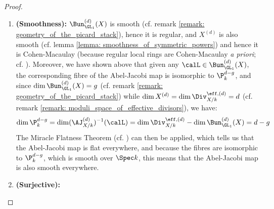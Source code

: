 \begin{proof}
\begin{enumerate}
                        \item \textbf{(Smoothness):} $\Bun_{\GL_1}^{(d)}(X)$ is smooth (cf. remark \ref{remark: geometry_of_the_picard_stack}), hence it is regular, and $X^{(d)}$ is also smooth (cf. lemma \ref{lemma: smoothness_of_symmetric_powers}) and hence it is Cohen-Macaulay (because regular local rings are Cohen-Macaulay \textit{a priori}; cf. \cite[\href{https://stacks.math.columbia.edu/tag/00NQ}{Tag 00NQ}]{stacks}). Moreover, we have shown above that given any $\calL \in \Bun_{\GL_1}^{(d)}(X)$, the corresponding fibre of the Abel-Jacobi map is isomorphic to $\P^{d - g}_k$, and since $\dim \Bun_{\GL_1}^{(d)}(X) = g$ (cf. remark \ref{remark: geometry_of_the_picard_stack}) while $\dim X^{(d)} = \dim \Div_{X/k}^{\eff, (d)} = d$ (cf. remark \ref{remark: moduli_space_of_effective_divisors}), we have:
                            $$\dim \P^{d - g}_k = \dim (\AJ_{X/k}^{(d)})^{-1}(\calL) = \dim \Div_{X/k}^{\eff, (d)} - \dim \Bun_{\GL_1}^{(d)}(X) = d - g$$
                        The Miracle Flatness Theorem (cf. \cite[\href{https://stacks.math.columbia.edu/tag/00R4}{Tag 00R4}]{stacks}) can then be applied, which tells us that the Abel-Jacobi map is flat everywhere, and because the fibres are isomorphic to $\P^{d - g}_k$, which is smooth over $\Spec k$, this means that the Abel-Jacobi map is also smooth everywhere.
                        \item \textbf{(Surjective):}
                    \end{enumerate}
                \end{proof}
                
